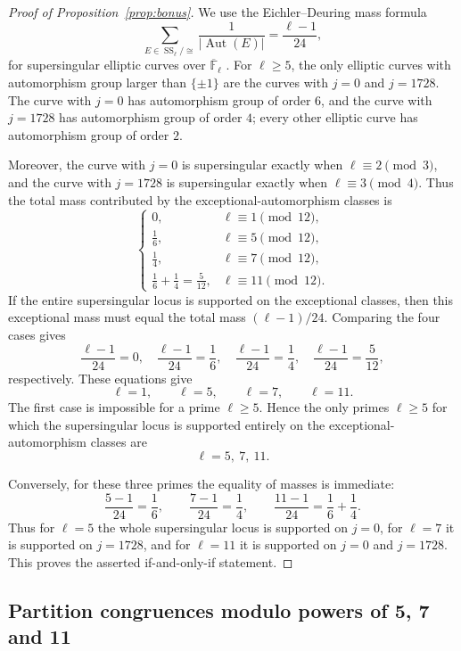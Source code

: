 \documentclass[12pt]{amsart}
\theoremstyle{definition}
\theoremstyle{remark}
\newcommand{\Aut}{\operatorname{Aut}}
\begin{document}
\begin{proof}[Proof of Proposition~\ref{prop:bonus}]
We use the Eichler--Deuring mass formula
\[
   \sum_{E\in \operatorname{SS}_{\ell}/\cong}\frac{1}{|\Aut(E)|}
   =\frac{\ell-1}{24},
\]
for supersingular elliptic curves over $\overline{\mathbb F}_{\ell}$
\cite[Chapter~V, \S4]{Silverman-AT}.  For $\ell\geq 5$,
the only elliptic curves with automorphism group larger than
$\{\pm 1\}$ are the curves with $j=0$ and $j=1728$.  The curve with
$j=0$ has automorphism group of order $6$, and the curve with
$j=1728$ has automorphism group of order $4$; every other elliptic
curve has automorphism group of order $2$.

Moreover, the curve with $j=0$ is supersingular exactly when
$\ell\equiv 2\pmod 3$, and the curve with $j=1728$ is supersingular
exactly when $\ell\equiv 3\pmod 4$.  Thus the total mass contributed by
the exceptional-automorphism classes is
\[
\begin{cases}
0, & \ell\equiv 1 \pmod {12},\\[2mm]
\frac16, & \ell\equiv 5 \pmod {12},\\[2mm]
\frac14, & \ell\equiv 7 \pmod {12},\\[2mm]
\frac16+\frac14=\frac{5}{12}, & \ell\equiv 11 \pmod {12}.
\end{cases}
\]
If the entire supersingular locus is supported on the exceptional
classes, then this exceptional mass must equal the total mass
$(\ell-1)/24$.  Comparing the four cases gives
\[
   \frac{\ell-1}{24}=0,\quad
   \frac{\ell-1}{24}=\frac16,\quad
   \frac{\ell-1}{24}=\frac14,\quad
   \frac{\ell-1}{24}=\frac{5}{12},
\]
respectively.  These equations give
\[
   \ell=1,\qquad \ell=5,\qquad \ell=7,\qquad \ell=11.
\]
The first case is impossible for a prime $\ell\geq 5$.  Hence the only
primes $\ell\geq 5$ for which the supersingular locus is supported
entirely on the exceptional-automorphism classes are
\[
   \ell=5,\ 7,\ 11.
\]

Conversely, for these three primes the equality of masses is immediate:
\[
   \frac{5-1}{24}=\frac16,\qquad
   \frac{7-1}{24}=\frac14,\qquad
   \frac{11-1}{24}=\frac16+\frac14.
\]
Thus for $\ell=5$ the whole supersingular locus is supported on
$j=0$, for $\ell=7$ it is supported on $j=1728$, and for $\ell=11$ it
is supported on $j=0$ and $j=1728$.  This proves the asserted
if-and-only-if statement.
\end{proof}


\subsection{Partition congruences modulo powers of 5, 7 and 11}
\end{document}
